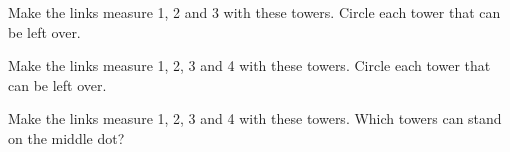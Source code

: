 \documentclass[12pt]{article}
\begin{document}
\vspace{0.4cm}
\hspace{3.0cm}

\vspace{0.7cm}
\begin{center}
\end{center}

\newpage
{} Make the links measure 1, 2 and 3 with these towers. Circle each tower that can be left over.

\vspace{0.6cm}
\hspace{3.2cm}

\vspace{1.6cm}
\begin{center}
\end{center}

\newpage
{} Make the links measure 1, 2, 3 and 4 with these towers. Circle each tower that can be left over.

\vspace{0.6cm}
\hspace{2.6cm}

\vspace{1.6cm}
\begin{center}
\end{center}

\newpage
{} Make the links measure 1, 2, 3 and 4 with these towers. Which towers can stand on the middle dot?

\vspace{0.6cm}
\hspace{2.0cm}

\vspace{1.6cm}
\begin{center}
\end{center}
\end{document}
